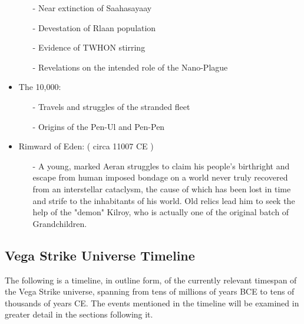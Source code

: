 \begin{itemize}
\begin{itemize}
\item	[-] Near extinction of Saahasayaay
\item	[-] Devestation of Rlaan population
\item	[-] Evidence of TWHON stirring
\item	[-] Revelations on the intended role of the Nano-Plague
\end{itemize}
\item	The 10,000:
\begin{itemize}
\item	[-] Travels and struggles of the stranded fleet
\item	[-] Origins of the Pen-Ul and Pen-Pen
\end{itemize}
\item	Rimward of Eden: ( circa 11007 CE )
\begin{itemize}
\item [-] A young, marked Aeran struggles to claim his people's
birthright and escape from human imposed bondage on a world never
truly recovered from an interstellar cataclysm, the cause of which has
been lost in time and strife to the inhabitants of his world. Old
relics lead him to seek the help of the "demon" Kilroy, who is
actually one of the original batch of Grandchildren.
\end{itemize}
\end{itemize}

\subsection{Vega Strike Universe Timeline}
\label{TimelineOutline}
The following is a timeline, in outline form, of the currently
relevant timespan of the Vega Strike universe, spanning from tens of
millions of years BCE to tens of thousands of years CE. The events
mentioned in the timeline will be examined in greater detail in the
sections following it.

